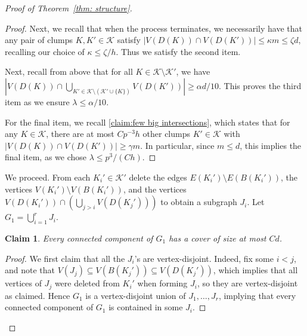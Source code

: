 \documentclass[10pt]{article}
\newtheorem{claim}[theorem]{Claim}
\theoremstyle{definition}
\newcommand\ab[1]{\lvert#1\rvert}
\let\leq\leqslant
\let\geq\geqslant
\begin{document}
\begin{proof}[Proof of Theorem~\ref{thm: structure}]
\begin{proof}
Next, we recall that when the process terminates, we necessarily have that any pair of clumps $K,K' \in \mathcal K$ satisfy $\ab{V(D(K))\cap V(D(K'))}\leq \kappa m\leq \zeta d$, recalling our choice of $\kappa \leq \zeta/h$. Thus we satisfy the second item.

Next, recall from above that for all $K \in \mathcal K \setminus \mathcal K'$, we have $|V(D(K))\cap \bigcup_{K'\in \mathcal K\setminus (\mathcal K'\cup \{K\})} V(D(K'))|\geq \alpha d/10$. This proves the third item as we ensure $\lambda \leq \alpha/10$.

For the final item, we recall \cref{claim:few big intersections}, which states that for any $K \in \mathcal K$, there are at most $Cp^{-3}h$ other clumps $K' \in \mathcal K$ with $\ab{V(D(K))\cap V(D(K'))}\geq \gamma m$. In particular, since $m\leq d$, this implies the final item, as we chose $\lambda \leq p^3/(Ch)$.
\end{proof}
 
 We proceed. From each $K_i'\in\mathcal K'$ delete the edges $E(K_i')\setminus E(B(K_i'))$, the vertices  $V(K_i')\setminus V(B(K_i'))$, and the  vertices $V(D(K_i'))\cap (\bigcup_{j>i} V(D(K_j')))$  to obtain a subgraph $J_i$. Let $G_1 = \bigcup_{i=1}^r J_i$. 
 \begin{claim}\label{claim:G4 good}
     Every connected component of $G_1$ has a cover of size at most $Cd$.
 \end{claim}
 \begin{proof}
 We first claim that all the $J_i$'s are vertex-disjoint. Indeed, fix some $i<j$, and note that $V(J_j)\subseteq V(B(K_j'))\subseteq  V(D(K_j'))$, which implies that all vertices of $J_j$ were deleted from $K_i'$ when forming $J_i$, so they are vertex-disjoint as claimed. 
Hence $G_1$ is a vertex-disjoint union of $J_1,\dots,J_r$, implying that every connected component of $G_1$ is contained in some $J_i$.
 

\end{proof}
\end{proof}
\end{document}

